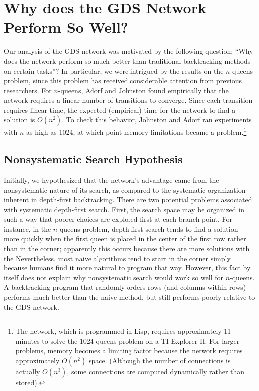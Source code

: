\documentclass[twoside,12pt,titlepage,a4paper]{article}
\begin{document}
\section{Why does the GDS Network Perform So Well?}
\label{mv-heuristic}

Our analysis of the GDS network was motivated by the following question:
``Why does the network perform so much better than traditional backtracking
methods on certain tasks''? In particular, we were intrigued by the results
on the $n$-queens problem, since this problem has received considerable
attention from previous researchers.  For $n$-queens, Adorf and Johnston
found empirically that the network requires a linear number of transitions to
converge. Since each transition requires linear time, the expected
(empirical) time for the network to find a solution is $O(n^2)$. To check
this behavior, Johnston and Adorf ran experiments with $n$ as high as 1024,
at which point memory limitations became a problem.\footnote{The network,
which is programmed in Lisp, requires approximately 11 minutes to solve the
1024 queens problem on a TI Explorer II. For larger problems, memory becomes
a limiting factor because the network requires approximately $O(n^{2})$
space.  (Although the number of connections is actually $O(n^{3})$, some
connections are computed dynamically rather than stored).}


\vspace*{-0.05in}
\subsection{Nonsystematic Search Hypothesis}
\vspace*{-0.05in}

Initially, we hypothesized that the network's advantage came from the
nonsystematic nature of its search, as compared to the systematic
organization inherent in depth-first backtracking. There are two
potential problems associated with systematic depth-first search.
First, the search space may be organized in such a way that poorer
choices are explored first at each branch point.  For instance, in the
$n$-queens problem, depth-first search tends to find a solution more
quickly when the first queen is placed in the center of the first row
rather than in the corner; apparently this occurs because
there are more solutions with the
Nevertheless,
most naive algorithms tend to start in the corner simply because
humans find it more natural to program that way.  However, this fact
by itself does not explain why nonsystematic search would work so well
for $n$-queens.  A backtracking program that randomly orders rows (and
columns within rows) performs much better than the naive method, but
still performs poorly relative to the GDS network.
\end{document}
